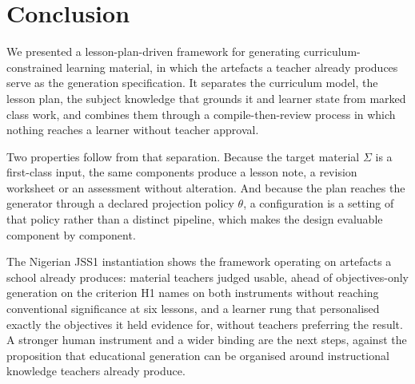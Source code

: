 \documentclass{article}
\begin{document}
\section{Conclusion}

We presented a lesson-plan-driven framework for generating curriculum-constrained learning
material, in which the artefacts a teacher already produces serve as the generation
specification. It separates the curriculum model, the lesson plan, the subject knowledge
that grounds it and learner state from marked class work, and combines them through a
compile-then-review process in which nothing reaches a learner without teacher approval.

Two properties follow from that separation. Because the target material $\Sigma$ is a
first-class input, the same components produce a lesson note, a revision worksheet or an
assessment without alteration. And because the plan reaches the generator through a declared
projection policy $\theta$, a configuration is a setting of that policy rather than a distinct
pipeline, which makes the design evaluable component by component.

The Nigerian JSS1 instantiation shows the framework operating on artefacts a school already
produces: material teachers judged usable, ahead of objectives-only generation on the criterion
H1 names on both instruments without reaching conventional significance at six lessons, and a
learner rung that personalised exactly the objectives it held evidence for, without teachers
preferring the result. A stronger human instrument and a wider binding are the next steps,
against the proposition that educational generation can be organised around instructional
knowledge teachers already produce.
\end{document}

